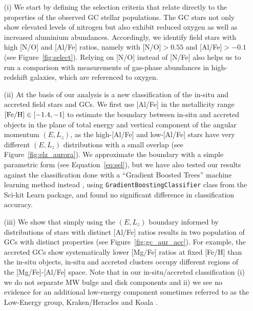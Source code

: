 \documentclass[a4paper,useAMS,usenatbib]{mnras}
\begin{document}
\begin{itemize}
     \item[(i)] We start by defining the selection criteria that relate directly to the properties of the observed GC stellar populations. The GC stars not only show elevated levels of nitrogen but also exhibit reduced oxygen as well as increased aluminium abundances. Accordingly, we identify field stars with high [N/O] and [Al/Fe] ratios, namely with [N/O]$>0.55$ and [Al/Fe]$>-0.1$ (see Figure~\ref{fig:select}). Relying on [N/O] instead of [N/Fe] also helps us to run a comparison with measurements of gas-phase abundances in high-redshift galaxies, which are referenced to oxygen.\\
    
    \item[(ii)] At the basis of our analysis is a new classification of the in-situ and accreted field stars and GCs. We first use [Al/Fe] in the metallicity range $\rm [Fe/H]\in [-1.4,-1]$ to estimate the boundary between in-situ and accreted objects in the plane of total energy and vertical component of the angular momentum $(E, L_z)$, as the high-[Al/Fe] and low-[Al/Fe] stars have very different $(E,L_z)$ distributions with a small overlap (see Figure~\ref{fig:elz_aurora}). We approximate the boundary with a simple parametric form  (see Equation~\ref{eq:sel}), but we have also tested our results against the classification done with a ``Gradient Boosted Trees'' machine learning method  instead \citep{Friedman.2001}, using {\tt GradientBoostingClassifier} class from the Sci-kit Learn package, and found no significant difference in classification accuracy. \\
      
    \item[(iii)] We show that simply using the $(E, L_z)$ boundary informed by distributions of stars with distinct [Al/Fe] ratios results in two population of GCs with distinct properties (see Figure~\ref{fig:gc_aur_acc}). For example, the accreted GCs show systematically lower [Mg/Fe] ratios at fixed [Fe/H] than the in-situ objects,  in-situ and accreted clusters occupy different regions of the [Mg/Fe]-[Al/Fe] space. Note that in our in-situ/accreted classification (i) we do not separate MW bulge and disk components and ii) we see no evidence for an additional low-energy component sometimes referred to as the Low-Energy group, Kraken/Heracles and Koala \citep[see][]{Massari2019,Krijssen2020,Forbes2020,Horta_heracles}.\\


\end{itemize}
\end{document}
